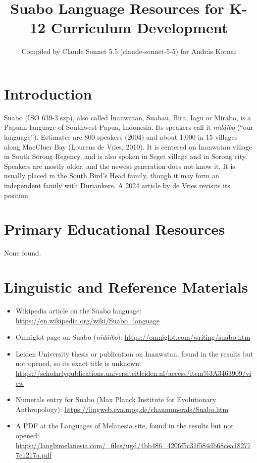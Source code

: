 \documentclass[12pt]{article}
\title{Suabo Language Resources for K-12 Curriculum Development}
\author{Compiled by Claude Sonnet 5.5 (claude-sonnet-5-5) for Andr\'as Kornai}
\date{}
\begin{document}
\maketitle

\section{Introduction}
Suabo (ISO 639-3 szp), also called Inanwatan, Suabau, Bira, Iagu or Mirabo, is a Papuan language of Southwest Papua, Indonesia. Its speakers call it \emph{nid\'aibo} (``our language''). Estimates are 800 speakers (2004) and about 1,000 in 15 villages along MacCluer Bay (Lourens de Vries, 2010). It is centered on Inanwatan village in South Sorong Regency, and is also spoken in Seget village and in Sorong city. Speakers are mostly older, and the newest generation does not know it. It is usually placed in the South Bird's Head family, though it may form an independent family with Duriankere. A 2024 article by de Vries revisits its position.

\section{Primary Educational Resources}
None found.

\section{Linguistic and Reference Materials}
\begin{itemize}
\item Wikipedia article on the Suabo language: \url{https://en.wikipedia.org/wiki/Suabo_language}
\item Omniglot page on Suabo (\emph{nid\'aibo}): \url{https://omniglot.com/writing/suabo.htm}
\item Leiden University thesis or publication on Inanwatan, found in the results but not opened, so its exact title is unknown: \url{https://scholarlypublications.universiteitleiden.nl/access/item%3A3463909/view}
\item Numerals entry for Suabo (Max Planck Institute for Evolutionary Anthropology): \url{https://lingweb.eva.mpg.de/channumerals/Suabo.htm}
\item A PDF at the Languages of Melanesia site, found in the results but not opened: \url{https://langlxmelanesia.com/_files/ugd/4bb486_4206f5c31f584db68cea182777c1217a.pdf}
\end{itemize}
\end{document}
